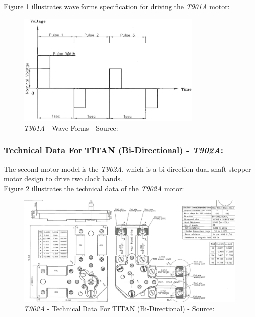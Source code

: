 \documentclass[report.tex]{subfiles}
\begin{document}
Figure \ref{fig:motor_single_wave_form} illustrates wave forms specification for driving the \textit{T901A} motor: 

\begin{figure}[H]
	\centering
	\includegraphics[width=0.8\textwidth]{Include/Figure/comp/motor_single_wave_form.png}
	\caption{\textit{T901A} - Wave Forms - Source: \cite{motor1}}
	\label{fig:motor_single_wave_form}
\end{figure}


\subsubsection{Technical Data For TITAN (Bi-Directional) - \textit{T902A}:}

The second motor model is the \textit{T902A}, which is a bi-direction dual shaft stepper motor design to drive two clock hands.\\

Figure \ref{fig:motor_double_schem} illustrates the technical data of the \textit{T902A} motor: 
\begin{figure}[H]
	\centering
	\includegraphics[width=1\textwidth]{Include/Figure/comp/motor_double_schem.png}
	\caption{\textit{T902A} - Technical Data For TITAN (Bi-Directional) - Source: \cite{motor2}}
	\label{fig:motor_double_schem}
\end{figure}
\end{document}
